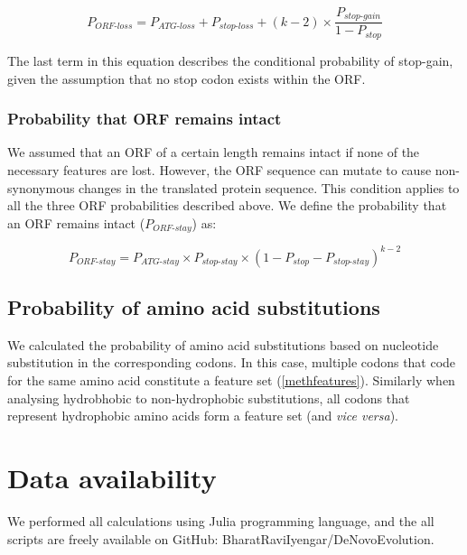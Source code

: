\documentclass[12pt,a4paper]{article}
\begin{document}
\begin{equation}
P_\textit{ORF-loss} = P_\textit{ATG-loss} + P_\textit{stop-loss} + (k-2)\times \frac{P_\textit{stop-gain}}{1-P_\textit{stop}}
\label{eqorfloss}
\end{equation}

The last term in this equation describes the conditional probability of stop-gain, given the assumption that no stop codon exists within the ORF.

\subsubsection{Probability that ORF remains intact}

We assumed that an ORF of a certain length remains intact if none of the necessary features are lost. However, the ORF sequence can mutate to cause non-synonymous changes in the translated protein sequence. This condition applies to all the three ORF probabilities described above. We define the probability that an ORF remains intact ($P_\textit{ORF-stay}$) as:

\begin{equation}
P_\textit{ORF-stay} = P_\textit{ATG-stay} \times P_\textit{stop-stay} \times (1 - P_\textit{stop} - P_\textit{stop-stay})^{k-2}
\label{eqorfstay}
\end{equation}

\subsection{Probability of amino acid substitutions}

We calculated the probability of amino acid substitutions based on nucleotide substitution in the corresponding codons. In this case, multiple codons that code for the same amino acid constitute a feature set (\autoref{methfeatures}). Similarly when analysing hydrobhobic to non-hydrophobic substitutions, all codons that represent hydrophobic amino acids form a feature set (and \textit{vice versa}).

\section{Data availability}
We performed all calculations using Julia programming language, and the all scripts are freely available on GitHub: BharatRaviIyengar/DeNovoEvolution. 



\end{document}

